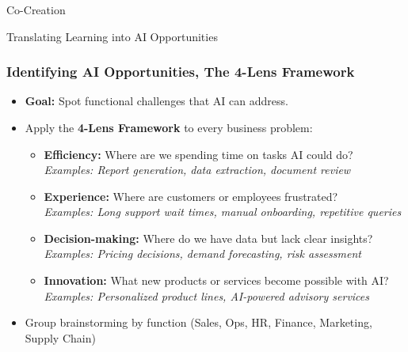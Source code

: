 \begin{frame}[fragile]\frametitle{}
\begin{center}
{\Large Co-Creation}

{\small Translating Learning into AI Opportunities}
\end{center}
\end{frame}

\begin{frame}[fragile]\frametitle{Identifying AI Opportunities, The 4-Lens Framework}

\begin{itemize}
  \item \textbf{Goal:} Spot functional challenges that AI can address.
  \item Apply the \textbf{4-Lens Framework} to every business problem:
    \begin{itemize}
      \item \textbf{Efficiency:} Where are we spending time on tasks AI could do?\\
        \textit{Examples: Report generation, data extraction, document review}
      \item \textbf{Experience:} Where are customers or employees frustrated?\\
        \textit{Examples: Long support wait times, manual onboarding, repetitive queries}
      \item \textbf{Decision-making:} Where do we have data but lack clear insights?\\
        \textit{Examples: Pricing decisions, demand forecasting, risk assessment}
      \item \textbf{Innovation:} What new products or services become possible with AI?\\
        \textit{Examples: Personalized product lines, AI-powered advisory services}
    \end{itemize}
  \item Group brainstorming by function (Sales, Ops, HR, Finance, Marketing, Supply Chain)
\end{itemize}

\end{frame}

